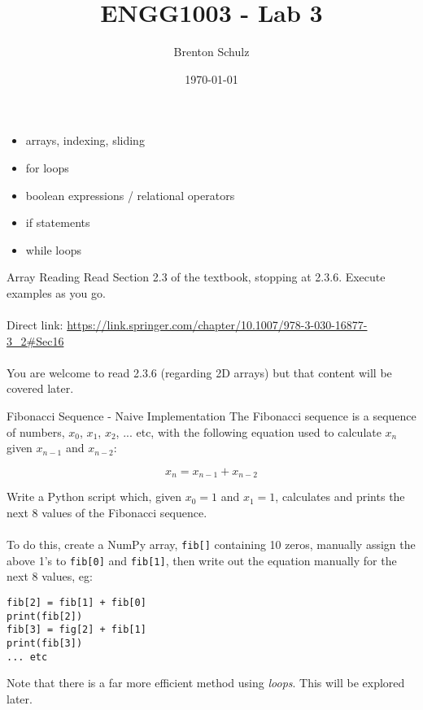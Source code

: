 \documentclass{lab}
\title{ENGG1003 - Lab 3}
\author{Brenton Schulz}
\date{\today}
\begin{document}
\maketitle

\begin{itemize}
\item arrays, indexing, sliding
\item  for loops
\item boolean expressions / relational operators
\item if statements
\item while loops
\end{itemize}

\begin{task}{Array Reading}{}
Read Section 2.3 of the textbook, stopping at 2.3.6. Execute examples as you go.
\\~\\
Direct link: \url{https://link.springer.com/chapter/10.1007/978-3-030-16877-3_2#Sec16}
\\~\\
You are welcome to read 2.3.6 (regarding 2D arrays) but that content will be covered later.
\end{task}

\begin{task}{Fibonacci  Sequence - Naive Implementation}{}
The Fibonacci sequence is a sequence of numbers, $x_0$, $x_1$, $x_2$, ... etc, with the following equation used to calculate $x_n$ given $x_{n-1}$ and $x_{n-2}$:

\begin{equation}
x_n = x_{n-1} + x_{n-2}
\end{equation}

Write a Python script which, given $x_0=1$ and $x_1=1$, calculates and prints the next 8 values of the Fibonacci sequence.
\\~\\
To do this, create a NumPy array, \texttt{fib[]} containing 10 zeros, manually assign the above 1's to \texttt{fib[0]} and \texttt{fib[1]}, then write out the equation manually for the next 8 values, eg:
\begin{lstlisting}
fib[2] = fib[1] + fib[0]
print(fib[2])
fib[3] = fig[2] + fib[1]
print(fib[3])
... etc
\end{lstlisting}

Note that there is a far more efficient method using \textit{loops}. This will be explored later.
\end{task}
\end{document}
